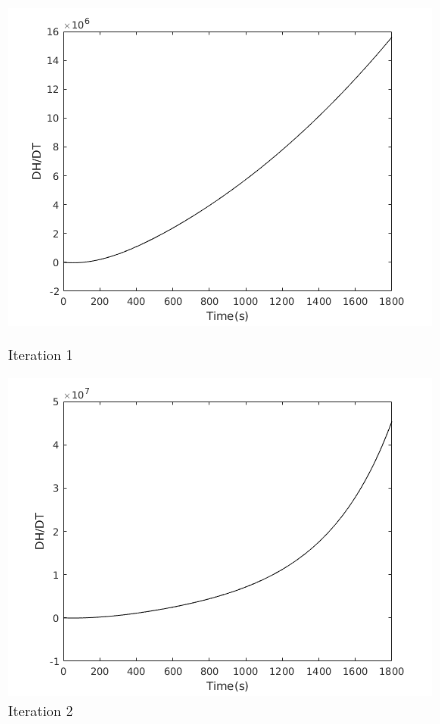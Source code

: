 \begin{figure}[h!]
  \centering
  \begin{minipage}[b]{0.4\textwidth}
    \includegraphics[width=\textwidth]{h1.png}
    \caption{Iteration 1}
  \end{minipage}
  \hfill
  \begin{minipage}[b]{0.4\textwidth}
    \includegraphics[width=\textwidth]{h2.png}
    \caption{Iteration 2}
  \end{minipage}
\end{figure}

